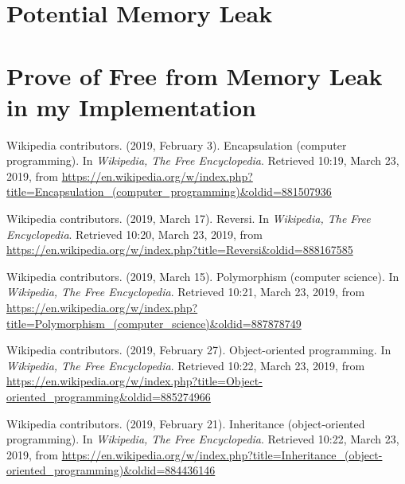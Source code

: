 \documentclass[a4paper]{report}
\begin{document}
\section{Potential Memory Leak}
\section{Prove of Free from Memory Leak in my Implementation}

\begin{thebibliography}{A}

Wikipedia contributors. (2019, February 3). Encapsulation (computer programming). In \emph{Wikipedia, The Free Encyclopedia}. Retrieved 10:19, March 23, 2019, from \url{https://en.wikipedia.org/w/index.php?title=Encapsulation_(computer_programming)&oldid=881507936}

Wikipedia contributors. (2019, March 17). Reversi. In \emph{Wikipedia, The Free Encyclopedia}. Retrieved 10:20, March 23, 2019, from \url{https://en.wikipedia.org/w/index.php?title=Reversi&oldid=888167585}

Wikipedia contributors. (2019, March 15). Polymorphism (computer science). In \emph{Wikipedia, The Free Encyclopedia}. Retrieved 10:21, March 23, 2019, from \url{https://en.wikipedia.org/w/index.php?title=Polymorphism_(computer_science)&oldid=887878749}

Wikipedia contributors. (2019, February 27). Object-oriented programming. In \emph{Wikipedia, The Free Encyclopedia}. Retrieved 10:22, March 23, 2019, from \url{https://en.wikipedia.org/w/index.php?title=Object-oriented_programming&oldid=885274966}

Wikipedia contributors. (2019, February 21). Inheritance (object-oriented programming). In \emph{Wikipedia, The Free Encyclopedia}. Retrieved 10:22, March 23, 2019, from \url{https://en.wikipedia.org/w/index.php?title=Inheritance_(object-oriented_programming)&oldid=884436146}

\end{thebibliography}
\end{document}
